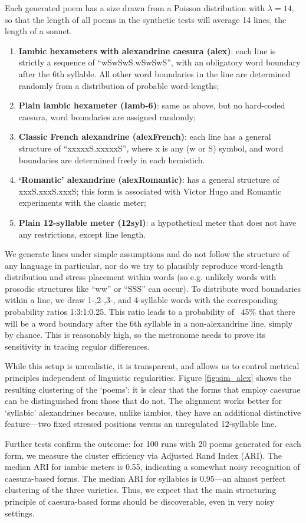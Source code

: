 \documentclass[
    hf
]{ceurart}
\begin{document}
Each generated poem has a size drawn from a Poisson distribution with $\lambda=14$, so that the length of all poems in the synthetic tests will average 14 lines, the length of a sonnet.

\begin{enumerate}
    \item \textbf{Iambic hexameters with alexandrine caesura (alex)}: each line is strictly a sequence of “wSwSwS.wSwSwS”, with an obligatory word boundary after the 6th syllable. All other word boundaries in the line are determined randomly from a distribution of probable word-lengths;
    \item \textbf{Plain iambic hexameter (Iamb-6)}: same as above, but no hard-coded caesura, word boundaries are assigned randomly;
    \item \textbf{Classic French alexandrine (alexFrench)}: each line has a general structure of “xxxxxS.xxxxxS”, where x is any (w or S) symbol, and word boundaries are determined freely in each hemistich.
    \item \textbf{`Romantic' alexandrine (alexRomantic)}: has a general structure of xxxS.xxxS.xxxS; this form is associated with Victor Hugo and Romantic experiments with the classic meter;
    \item \textbf{Plain 12-syllable meter (12syl)}: a hypothetical meter that does not have any restrictions, except line length.
\end{enumerate}

We generate lines under simple assumptions and do not follow the structure of any language in particular, nor do we try to plausibly reproduce word-length distribution and stress placement within words (so e.g. unlikely words with prosodic structures like “ww” or “SSS” can occur). To distribute word boundaries within a line,  we draw 1-,2-,3-, and 4-syllable words with the corresponding probability ratios 1:3:1:0.25. This ratio leads to a  probability of ~45\% that there will be a word boundary after the 6th syllable in a non-alexandrine line, simply by chance. This is reasonably high, so the metronome needs to prove its sensitivity in tracing regular differences.

While this setup is unrealistic, it is transparent, and allows us to control metrical principles independent of linguistic regularities. Figure \ref{fig:sim_alex} shows the resulting clustering of the `poems': it is clear that the forms that employ caesurae can be distinguished from those that do not. The alignment works better for `syllabic' alexandrines because, unlike iambics, they have an additional distinctive feature---two fixed stressed positions versus an unregulated 12-syllable line.

Further tests confirm the outcome: for 100 runs with 20 poems generated for each form, we measure the cluster efficiency via Adjusted Rand Index (ARI). The median ARI for iambic meters is 0.55, indicating a somewhat noisy recognition of caesura-based forms. The median ARI for syllabics is 0.95---an almost perfect clustering of the three varieties. Thus, we expect that the main structuring principle of caesura-based forms should be discoverable, even in very noisy settings.

\onecolumn
\end{document}
